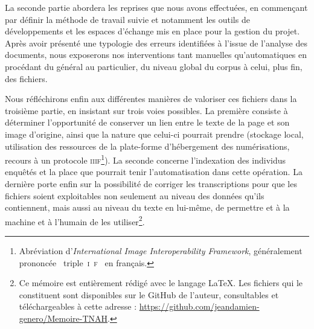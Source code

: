 La seconde partie abordera les reprises que nous avons effectuées, en commençant par définir la méthode de travail suivie et notamment les outils de développements et les espaces d'échange  mis en place pour la gestion du projet. Après avoir présenté une typologie des erreurs identifiées à l'issue de l'analyse des documents, nous exposerons nos interventions tant manuelles qu'automatiques en procédant du général au particulier, \cad{} du niveau global du corpus à celui, plus fin, des fichiers.

Nous réfléchirons enfin aux différentes manières de valoriser ces fichiers dans la troisième partie, en insistant sur trois voies possibles. La première consiste à déterminer l'opportunité de conserver un lien entre le texte de la page et son image d'origine, ainsi que la nature que celui-ci pourrait prendre (stockage local, utilisation des ressources de la plate-forme d'hébergement des numérisations, recours à un protocole \textsc{iiif}\footnote{Abréviation d'\textit{International Image Interoperability Framework}, généralement prononcée \og~triple~\textsc{i}~\textsc{f}~\fg{} en français.}). La seconde concerne l'indexation des individus enquêtés et la place que pourrait tenir l'automatisation dans cette opération. La dernière porte enfin sur la possibilité de corriger les transcriptions pour que les fichiers soient exploitables non seulement au niveau des données qu'ils contiennent, mais aussi au niveau du texte en lui-même, \cad{} de permettre et à la machine et à l'humain de les utiliser\footnote{Ce mémoire est entièrement rédigé avec le langage \LaTeX. Les fichiers qui le constituent sont disponibles sur le GitHub de l'auteur, consultables et téléchargeables à cette adresse : \url{https://github.com/jeandamien-genero/Memoire-TNAH}.}.

